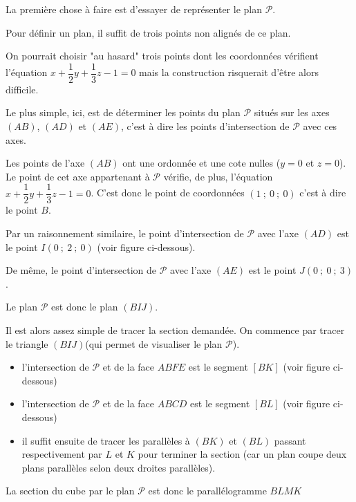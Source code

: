 \begin{corrige}
     La première chose à faire est d'essayer de représenter le plan $\mathscr P$.
     \par

     Pour définir un plan, il suffit de trois points non alignés de ce plan.
     \par
     On pourrait choisir "au hasard" trois points dont les coordonnées vérifient l'équation $x+\dfrac{1}{2} y +\dfrac{1}{3}z -1 = 0$ mais la construction risquerait d'être alors difficile.
     \par
     Le plus simple, ici, est de déterminer les points du plan $\mathscr P$ situés sur les axes $(AB)$, $(AD)$ et $(AE)$, c'est à dire les points d'intersection de $\mathscr P$ avec ces axes.
     \par
     Les points de l'axe $(AB)$ ont une ordonnée et une cote nulles ($y=0$ et $z=0$). Le point de cet axe appartenant à $\mathscr P$ vérifie, de plus, l'équation  $x+\dfrac{1}{2} y +\dfrac{1}{3}z -1 = 0$. C'est donc le point de coordonnées $(1~;~0~;~0)$ c'est à dire le point $B$.
     \par
     Par un raisonnement similaire, le point d'intersection de $\mathscr P$ avec l'axe $(AD)$ est le point $I(0~;~2~;~0)$ (voir figure ci-dessous).
     \par
     De même, le point d'intersection de $\mathscr P$ avec l'axe $(AE)$ est le point $J(0~;~0~;~3)$.
     \par
     Le plan $\mathscr P$ est donc le plan $(BIJ)$.
     \par
     Il est alors assez simple de tracer la section demandée. On commence par tracer le triangle $(BIJ)$(qui permet de visualiser le plan $\mathscr P$).
     \begin{itemize}
          \item
          l'intersection de $\mathscr P$ et de la face $ABFE$ est le segment $[BK]$ (voir figure ci-dessous)
          \item
          l'intersection de $\mathscr P$ et de la face $ABCD$ est le segment $[BL]$ (voir figure ci-dessous)
          \item
          il suffit ensuite de tracer les parallèles à $(BK)$ et $(BL)$ passant respectivement par $L$ et $K$ pour terminer la section (car un plan coupe deux plans parallèles selon deux droites parallèles).
     \end{itemize}

\begin{center}
\end{center}

     La section du cube par le plan $\mathscr{P}$ est donc le parallélogramme $BLMK$
\end{corrige}
